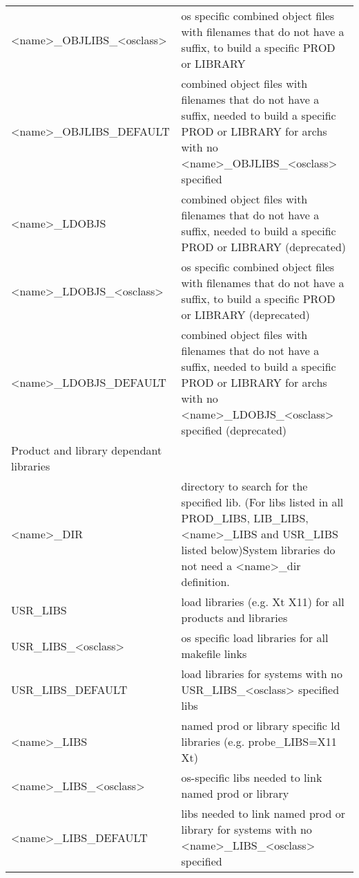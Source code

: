 \begin{center}
\begin{longtable}{p{2.94784in}p{3.76247in}}
\textless{}name\textgreater{}\_OBJLIBS\_\textless{}osclass\textgreater{} & os specific combined object files with filenames that do not have a suffix, to build a specific PROD or LI\textbar{}BRARY\\
\textless{}name\textgreater{}\_OBJLIBS\_DEFAULT & combined object files with filenames that do not have a suffix, needed to build a specific PROD or LIBRARY for archs with no \textless{}name\textgreater{}\_OBJLIBS\_\textless{}osclass\textgreater{} specified\\
\textless{}name\textgreater{}\_LDOBJS & combined object files with filenames that do not have a suffix, needed to build a specific PROD or LIBRARY (deprecated)\\
\textless{}name\textgreater{}\_LDOBJS\_\textless{}osclass\textgreater{} & os specific combined object files with filenames that do not have a suffix, to build a specific PROD or LI\textbar{}BRARY (deprecated)\\
\textless{}name\textgreater{}\_LDOBJS\_DEFAULT & combined object files with filenames that do not have a suffix, needed to build a specific PROD or LIBRARY for archs with no \textless{}name\textgreater{}\_LDOBJS\_\textless{}osclass\textgreater{} specified (deprecated)\\
Product and library dependant libraries & \\
\textless{}name\textgreater{}\_DIR & directory to search for the specified lib. (For libs listed in all PROD\_LIBS, LIB\_LIBS, \textless{}name\textgreater{}\_LIBS and USR\_LIBS listed below)System libraries do not need a \textless{}name\textgreater{}\_dir definition.\\
USR\_LIBS & load libraries (e.g. Xt X11) for all products and libraries\\
USR\_LIBS\_\textless{}osclass\textgreater{} & os specific load libraries for all makefile links\\
USR\_LIBS\_DEFAULT & load libraries for systems with no USR\_LIBS\_\textless{}osclass\textgreater{} specified libs\\
\textless{}name\textgreater{}\_LIBS & named prod or library specific ld libraries (e.g. probe\_LIBS=X11 Xt)\\
\textless{}name\textgreater{}\_LIBS\_\textless{}osclass\textgreater{} & os-specific libs needed to link named prod or library\\
\textless{}name\textgreater{}\_LIBS\_DEFAULT & libs needed to link named prod or library for systems with no \textless{}name\textgreater{}\_LIBS\_\textless{}osclass\textgreater{} specified\\

\end{longtable}
\end{center}
